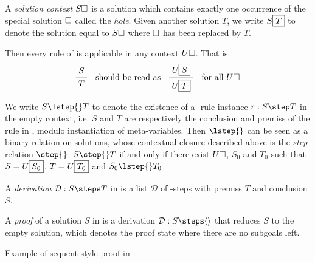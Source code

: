 \begin{definition}
A \emph{solution context} $S\square$ is a solution which contains exactly one
occurrence of the special solution $\square$ called the \emph{hole}. Given
another solution $T$, we write $S\fbox{$T$}$ to denote the solution equal to
$S\square$ where $\square$ has been replaced by $T$.
\end{definition}

Then every rule of  is applicable in any
context $U\square$. That is:
$$\vcenter{\R{S}{T}} \quad \text{should be read as} \quad
\vcenter{\R{U\select{S}}{U\select{T}}} \quad \text{for all $U\hole$}$$

\begin{definition}[\kl{BJ}-step]
We write $S \lstep{} T$ to denote the existence of a -rule instance
$\irule{r}{S}{T}$ in the empty context, i.e. $S$ and $T$ are respectively the
conclusion and premiss of the rule {} in , modulo
instantiation of meta-variables.
Then $\lstep{}$ can be seen as a binary relation on solutions, whose contextual
closure described above is the \emph{step} relation $\step{}$: $S \step{} T$ if
and only if there exist $U\square$, $S_0$ and $T_0$ such that $S =
U\fbox{$S_0$}$, $T = U\fbox{$T_0$}$ and $S_0 \lstep{} T_0$.
\end{definition}

\begin{definition}[\kl{BJ}-derivation]

A \emph{derivation} $\deriv{\mathcal{D}}{S}{T}$ in  is a list
$\mathcal{D}$ of -steps with premiss $T$ and conclusion $S$.
\end{definition}

\begin{definition}[\kl{BJ}-proof]
A \emph{proof} of a solution $S$ in  is a derivation
$\deriv{\mathcal{D}}{S}{\piq{}}$ that reduces $S$ to the empty solution, which
denotes the proof state where there are no subgoals left.
\end{definition}

\begin{marginfigure}

\caption{Example of sequent-style proof in }
\end{marginfigure}

